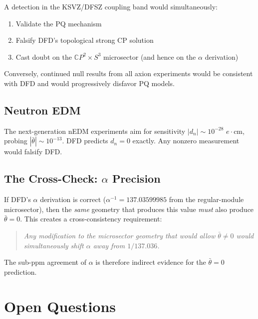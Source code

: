 \documentclass[11pt]{article}
\theoremstyle{remark}
\begin{document}
A detection in the KSVZ/DFSZ coupling band would simultaneously:
\begin{enumerate}
\item Validate the PQ mechanism
\item Falsify DFD's topological strong CP solution
\item Cast doubt on the $\mathbb{C}P^2 \times S^3$ microsector
  (and hence on the $\alpha$ derivation)
\end{enumerate}

Conversely, continued null results from all axion experiments would be
consistent with DFD and would progressively disfavor PQ models.

\subsection{Neutron EDM}

The next-generation nEDM experiments aim for sensitivity
$|d_n| \sim 10^{-28}$ $e\cdot$cm, probing $|\bar\theta| \sim 10^{-13}$.
DFD predicts $d_n = 0$ exactly.  Any nonzero measurement would falsify DFD.

\subsection{The Cross-Check: $\alpha$ Precision}

If DFD's $\alpha$ derivation is correct ($\alpha^{-1} = 137.03599985$ from
the regular-module microsector), then the \emph{same} geometry that produces
this value \emph{must} also produce $\bar\theta = 0$.  This creates a
cross-consistency requirement:
\begin{quote}
\emph{Any modification to the microsector geometry that would allow
$\bar\theta \neq 0$ would simultaneously shift $\alpha$ away from
$1/137.036$.}
\end{quote}
The sub-ppm agreement of $\alpha$ is therefore indirect evidence for the
$\bar\theta = 0$ prediction.

\section{Open Questions}
\end{document}
